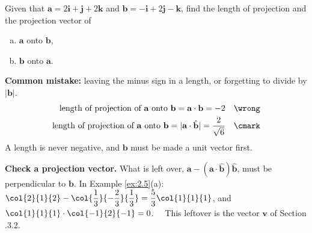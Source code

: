 \begin{example}[label=ex:2.5]
Given that $\mathbf{a} = 2\mathbf{i} + \mathbf{j} + 2\mathbf{k}$ and $\mathbf{b} = -\mathbf{i} + 2\mathbf{j} - \mathbf{k}$, find the length of projection and the projection vector of
\begin{enumerate}[(a)]
  \item $\mathbf{a}$ onto $\mathbf{b}$,
  \item $\mathbf{b}$ onto $\mathbf{a}$.
\end{enumerate}
\end{example}

\begin{mistake}
\textbf{Common mistake:} leaving the minus sign in a length, or forgetting to divide by $|\mathbf{b}|$.
\begin{align*}
\text{length of projection of $\mathbf{a}$ onto $\mathbf{b}$} = \mathbf{a}\cdot\mathbf{b} = -2 & & \wrong \\
\text{length of projection of $\mathbf{a}$ onto $\mathbf{b}$} = |\mathbf{a}\cdot\hat{\mathbf{b}}| = \dfrac{2}{\sqrt{6}} & & \cmark
\end{align*}
A length is never negative, and $\mathbf{b}$ must be made a unit vector first.
\end{mistake}

\begin{info}
\textbf{Check a projection vector.} What is left over, $\mathbf{a} - (\mathbf{a}\cdot\hat{\mathbf{b}})\hat{\mathbf{b}}$, must be perpendicular to $\mathbf{b}$. In Example \ref{ex:2.5}(a): $\col{2}{1}{2} - \col{\dfrac{1}{3}}{-\dfrac{2}{3}}{\dfrac{1}{3}} = \dfrac{5}{3}\col{1}{1}{1}$, and $\col{1}{1}{1}\cdot\col{-1}{2}{-1} = 0$. \ \cmark\ This leftover is the vector $\mathbf{v}$ of Section \chapnum.3.2.
\end{info}

